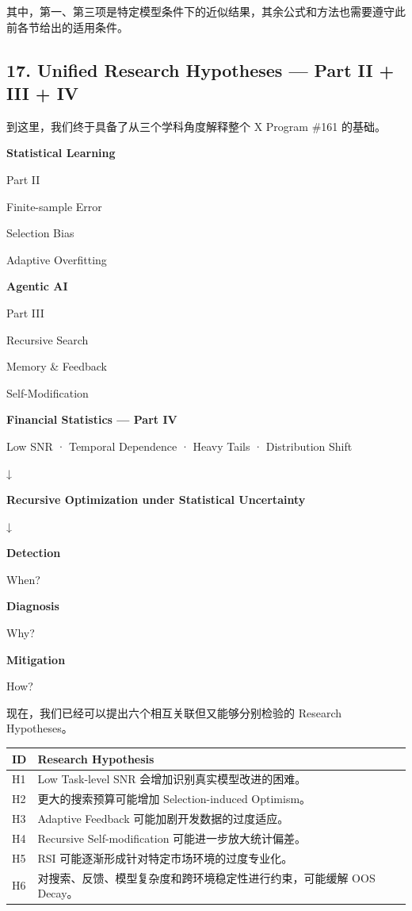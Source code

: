 其中，第一、第三项是特定模型条件下的近似结果，其余公式和方法也需要遵守此前各节给出的适用条件。

\hypertarget{part-4-77-0001-unified-research-hypotheses-part-ii-iii-iv}{%
\subsection{17. Unified Research Hypotheses --- Part II + III + IV}\label{part-4-77-0001-unified-research-hypotheses-part-ii-iii-iv}}

到这里，我们终于具备了从三个学科角度解释整个 X Program \#161 的基础。

\textbf{Statistical Learning}

Part II

Finite-sample Error

Selection Bias

Adaptive Overfitting

\textbf{Agentic AI}

Part III

Recursive Search

Memory \& Feedback

Self-Modification

\textbf{Financial Statistics --- Part IV}

Low SNR · Temporal Dependence · Heavy Tails · Distribution Shift

↓

\textbf{Recursive Optimization under Statistical Uncertainty}

↓


\textbf{Detection}

When?

\textbf{Diagnosis}

Why?

\textbf{Mitigation}

How?

现在，我们已经可以提出六个相互关联但又能够分别检验的 Research Hypotheses。

\begin{readertable}
\begin{longtable}[]{@{}
  >{\raggedright\arraybackslash}p{}
  >{\raggedright\arraybackslash}p{}@{}}
\toprule
ID & Research Hypothesis \\
\midrule
\endhead
H1 & Low Task-level SNR 会增加识别真实模型改进的困难。 \\
H2 & 更大的搜索预算可能增加 Selection-induced Optimism。 \\
H3 & Adaptive Feedback 可能加剧开发数据的过度适应。 \\
H4 & Recursive Self-modification 可能进一步放大统计偏差。 \\
H5 & RSI 可能逐渐形成针对特定市场环境的过度专业化。 \\
H6 & 对搜索、反馈、模型复杂度和跨环境稳定性进行约束，可能缓解 OOS Decay。 \\
\bottomrule
\end{longtable}
\end{readertable}

